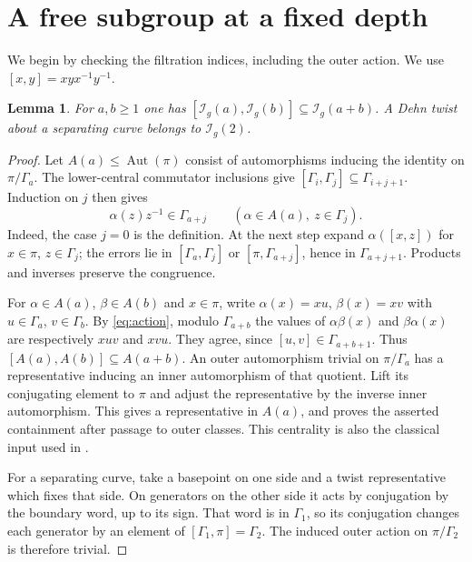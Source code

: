 \documentclass[11pt]{article}
\newtheorem{lemma}[theorem]{Lemma}
\theoremstyle{remark}\newtheorem*{remark}{Remark}
\newcommand{\Aut}{\operatorname{Aut}}
\newcommand{\I}{\mathcal I}
\begin{document}
\section{A free subgroup at a fixed depth}
We begin by checking the filtration indices, including the outer action.
We use $[x,y]=xyx^{-1}y^{-1}$.

\begin{lemma}\label{lem:central}
For $a,b\ge1$ one has
$[\I_g(a),\I_g(b)]\subseteq\I_g(a+b)$.
A Dehn twist about a separating curve belongs to $\I_g(2)$.
\end{lemma}
\begin{proof}
Let $A(a)\le\Aut(\pi)$ consist of automorphisms inducing the identity on
$\pi/\Gamma_a$. The lower-central commutator inclusions give
$[\Gamma_i,\Gamma_j]\subseteq\Gamma_{i+j+1}$.
Induction on $j$ then gives
\begin{equation}\label{eq:action}
 \alpha(z)z^{-1}\in\Gamma_{a+j}
 \qquad(\alpha\in A(a),\ z\in\Gamma_j).
\end{equation}
Indeed, the case $j=0$ is the definition. At the next step expand
$\alpha([x,z])$ for $x\in\pi$, $z\in\Gamma_j$; the errors lie in
$[\Gamma_a,\Gamma_j]$ or $[\pi,\Gamma_{a+j}]$, hence in
$\Gamma_{a+j+1}$. Products and inverses preserve the congruence.

For $\alpha\in A(a)$, $\beta\in A(b)$ and $x\in\pi$, write
$\alpha(x)=xu$, $\beta(x)=xv$ with $u\in\Gamma_a$, $v\in\Gamma_b$.
By \eqref{eq:action}, modulo $\Gamma_{a+b}$ the values of
$\alpha\beta(x)$ and $\beta\alpha(x)$ are respectively $xuv$ and $xvu$.
They agree, since $[u,v]\in\Gamma_{a+b+1}$.
Thus $[A(a),A(b)]\subseteq A(a+b)$.
An outer automorphism trivial on $\pi/\Gamma_a$ has a representative
inducing an inner automorphism of that quotient. Lift its conjugating
element to $\pi$ and adjust the representative by the inverse inner
automorphism. This gives a representative in $A(a)$, and proves the
asserted containment after passage to outer classes. This centrality is
also the classical input used in \cite[proof of Proposition 4.8]{FLM}.

For a separating curve, take a basepoint on one side and a twist
representative which fixes that side. On generators on the other side
it acts by conjugation by the boundary word, up to its sign. That word
is in $\Gamma_1$, so its conjugation changes each generator by an element
of $[\Gamma_1,\pi]=\Gamma_2$. The induced outer action on
$\pi/\Gamma_2$ is therefore trivial.
\end{proof}
\end{document}
